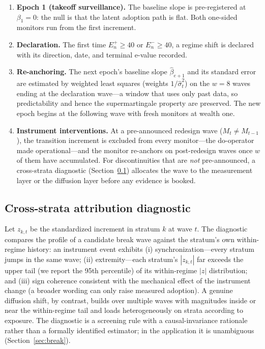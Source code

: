 \documentclass[review,authoryear,12pt]{elsarticle}
\begin{document}
\begin{enumerate}
\item \textbf{Epoch 1 (takeoff surveillance).} The baseline slope is pre-registered at $\beta_1 = 0$: the null is that the latent adoption path is flat. Both one-sided monitors run from the first increment.
\item \textbf{Declaration.} The first time $E_n^{+} \ge 40$ or $E_n^{-} \ge 40$, a regime shift is declared with its direction, date, and terminal e-value recorded.
\item \textbf{Re-anchoring.} The next epoch's baseline slope $\hat{\beta}_{e+1}$ and its standard error are estimated by weighted least squares (weights $1/\hat{\sigma}_t^2$) on the $w = 8$ waves ending at the declaration wave---a window that uses only past data, so predictability and hence the supermartingale property are preserved. The new epoch begins at the following wave with fresh monitors at wealth one.
\item \textbf{Instrument interventions.} At a pre-announced redesign wave ($M_t \neq M_{t-1}$), the transition increment is excluded from every monitor---the do-operator made operational---and the monitor re-anchors on post-redesign waves once $w$ of them have accumulated. For discontinuities that are \emph{not} pre-announced, a cross-strata diagnostic (Section~\ref{sec:diagnostic}) allocates the wave to the measurement layer or the diffusion layer before any evidence is booked.
\end{enumerate}

\subsection{Cross-strata attribution diagnostic}
\label{sec:diagnostic}

Let $z_{k,t}$ be the standardized increment in stratum $k$ at wave $t$. The diagnostic compares the profile of a candidate break wave against the stratum's own within-regime history: an instrument event exhibits (i) synchronization---every stratum jumps in the same wave; (ii) extremity---each stratum's $|z_{k,t}|$ far exceeds the upper tail (we report the 95th percentile) of its within-regime $|z|$ distribution; and (iii) sign coherence consistent with the mechanical effect of the instrument change (a broader wording can only raise measured adoption). A genuine diffusion shift, by contrast, builds over multiple waves with magnitudes inside or near the within-regime tail and loads heterogeneously on strata according to exposure. The diagnostic is a screening rule with a causal-invariance rationale \citep{peters2016,rothenhausler2021} rather than a formally identified estimator; in the application it is unambiguous (Section~\ref{sec:break}).
\end{document}

